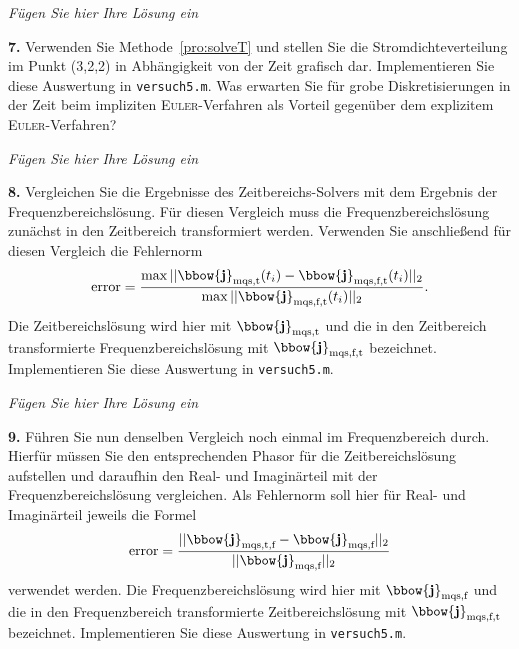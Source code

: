 \documentclass[Protokollheft.tex]{subfiles}
\begin{document}
\emph{Fügen Sie hier Ihre Lösung ein}

\begin{framed}
	\noindent \textbf{7.} Verwenden Sie Methode~\eqref{pro:solveT} und stellen Sie die Stromdichteverteilung im Punkt (3,2,2) in Abhängigkeit von der Zeit grafisch dar. Implementieren Sie diese Auswertung in \lstinline{versuch5.m}. Was erwarten Sie für grobe Diskretisierungen in der Zeit beim impliziten \textsc{Euler}-Verfahren als Vorteil gegenüber dem explizitem \textsc{Euler}-Verfahren?\label{exer:currDensityTimeDependent}
\end{framed}

\emph{Fügen Sie hier Ihre Lösung ein}

\begin{framed}
	\noindent \textbf{8.} Vergleichen Sie die Ergebnisse des Zeitbereichs-Solvers mit dem Ergebnis der Frequenzbereichslösung. Für diesen Vergleich muss die Frequenzbereichslösung zunächst in den Zeitbereich transformiert werden. Verwenden Sie anschließend für diesen Vergleich die Fehlernorm
      \begin{equation}
          \text{error} = \frac{\max||\bbow{\mathbf{j}}_\text{mqs,t}(t_i)-\bbow{\mathbf{j}}_\text{mqs,f,t}(t_i)||_2}{\max||\bbow{\mathbf{j}}_\text{mqs,f,t}(t_i)||_2}.
          \label{eq:errorNorm}
      \end{equation}
Die Zeitbereichslösung wird hier mit $\bbow{\mathbf{j}}_\text{mqs,t}$ und die in den Zeitbereich transformierte Frequenzbereichslösung mit $\bbow{\mathbf{j}}_\text{mqs,f,t}$ bezeichnet. Implementieren Sie diese Auswertung in \lstinline{versuch5.m}.\label{exer:compareFreqVStimeInTime}
\end{framed}

\emph{Fügen Sie hier Ihre Lösung ein}

\begin{framed}
	\noindent \textbf{9.} Führen Sie nun denselben Vergleich noch einmal im Frequenzbereich durch. Hierfür müssen Sie den entsprechenden Phasor für die Zeitbereichslösung aufstellen und daraufhin den Real- und Imaginärteil mit der Frequenzbereichslösung vergleichen. Als Fehlernorm soll hier für Real- und Imaginärteil jeweils die Formel
    \begin{equation}
        \text{error} = \frac{||\bbow{\mathbf{j}}_\text{mqs,t,f}-\bbow{\mathbf{j}}_\text{mqs,f}||_2}{||\bbow{\mathbf{j}}_\text{mqs,f}||_2}
    \end{equation}
    verwendet werden. Die Frequenzbereichslösung wird hier mit $\bbow{\mathbf{j}}_\text{mqs,f}$ und die in den Frequenzbereich transformierte Zeitbereichslösung mit $\bbow{\mathbf{j}}_\text{mqs,f,t}$ bezeichnet. Implementieren Sie diese Auswertung in \lstinline{versuch5.m}.\label{exer:compareFreqVStimeInFreq}
\end{framed}
\end{document}
